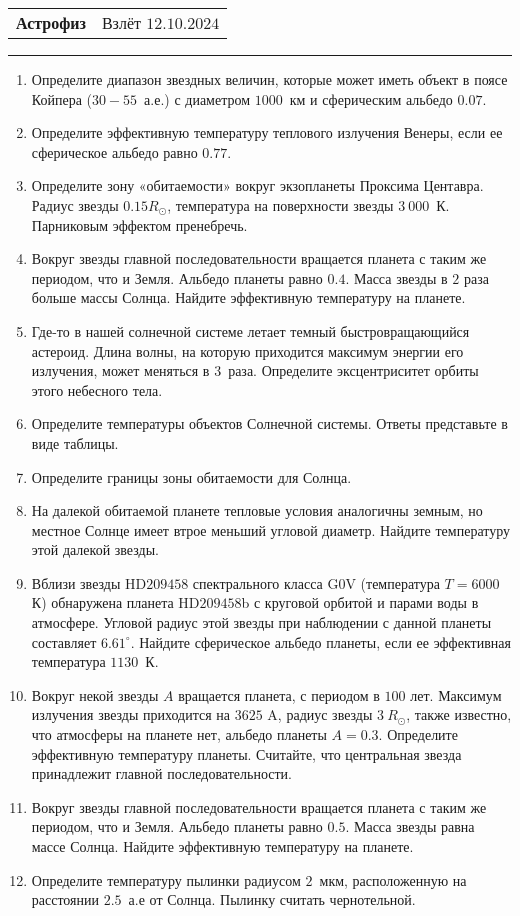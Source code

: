 \documentclass[12pt]{article}
\begin{document}
\begin{tabularx}{\textwidth}{Xr}
{\Large \textbf{Астрофиз}} & Взлёт $12.10.2024$ \\
\end{tabularx}
\noindent\rule{\textwidth}{0.4pt}
\begin{enumerate}
    \item{Определите диапазон звездных величин, которые может иметь объект в поясе Койпера ($30-55$~а.е.) с диаметром $1000$~км и сферическим альбедо $0.07$.}
    \item{Определите эффективную температуру теплового излучения Венеры, если ее сферическое альбедо равно $0.77$.}
    \item{Определите зону «обитаемости» вокруг экзопланеты Проксима Центавра. Радиус звезды $0.15 R_{\odot}$, температура на поверхности звезды $3~000$~К. Парниковым эффектом пренебречь.}
    \item{Вокруг звезды главной последовательности вращается планета с таким же периодом, что и Земля. Альбедо планеты равно $0.4$. Масса звезды в $2$ раза больше массы Солнца. Найдите эффективную температуру на планете.}
    \item{Где-то в нашей солнечной системе летает темный быстровращающийся астероид. Длина волны, на которую приходится максимум энергии его излучения, может меняться в $3$~раза. Определите эксцентриситет орбиты этого небесного тела.}
    \item Определите температуры объектов Солнечной системы. Ответы представьте в виде таблицы.
    \item Определите границы зоны обитаемости для Солнца.
    \item На далекой обитаемой планете тепловые условия аналогичны земным, но местное Солнце имеет втрое меньший угловой диаметр. Найдите температуру этой далекой звезды.
    \item Вблизи звезды HD$209458$ спектрального класса G$0$V (температура $T = 6000$ К) обнаружена планета HD$209458$b с круговой орбитой и парами воды в атмосфере. Угловой радиус этой звезды при наблюдении с данной планеты составляет $6.61^{\circ}$. Найдите сферическое альбедо планеты, если ее эффективная температура $1130$~К.
    \item Вокруг некой звезды $A$ вращается планета, с периодом в $100$ лет. Максимум излучения звезды приходится на $3625$ A, радиус звезды $3~R_{\odot}$, также известно, что атмосферы на планете нет, альбедо планеты $A=0.3$. Определите эффективную температуру планеты. Считайте, что центральная звезда принадлежит главной последовательности.
    \item Вокруг звезды главной последовательности вращается планета с таким же периодом, что и Земля. Альбедо планеты равно $0.5$. Масса звезды равна массе Солнца. Найдите эффективную температуру на планете.
    \item Определите температуру пылинки радиусом $2$~мкм, расположенную на расстоянии $2.5$~а.е от Солнца. Пылинку считать чернотельной.
\end{enumerate}
\end{document}
